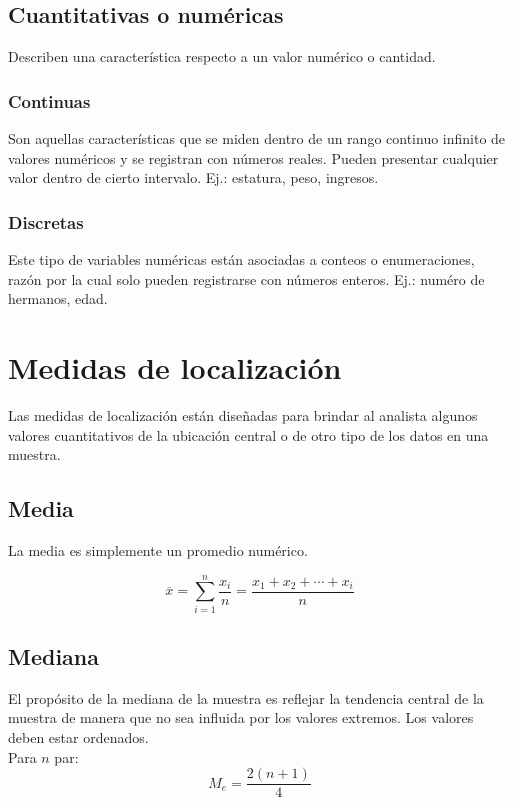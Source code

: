 \documentclass{report}
\begin{document}
      \subsection*{Cuantitativas o numéricas}
        Describen una característica respecto a un valor numérico o cantidad.

        \subsubsection*{Continuas}
          Son aquellas características que se miden dentro de un rango continuo 
          infinito de valores numéricos y se registran con números reales. Pueden 
          presentar cualquier valor dentro de cierto intervalo. Ej.: estatura, 
          peso, ingresos.
        \subsubsection*{Discretas}
          Este tipo de variables numéricas están asociadas a conteos o enumeraciones, 
          razón por la cual solo pueden registrarse con números enteros. Ej.: numéro
          de hermanos, edad.
    \section*{Medidas de localización}
      Las medidas de localización están diseñadas para brindar al analista algunos 
      valores cuantitativos de la ubicación central o de otro tipo de los datos en una 
      muestra.
      
      \subsection*{Media}
        La media es simplemente un promedio numérico.

        \begin{equation*}
          \overline{x}=\sum_{i = 1}^n\frac{x_i}{n}=\frac{x_1+x_2+\dotsm+x_i}{n}
        \end{equation*}

        \subsection*{Mediana}
          El propósito de la mediana de la muestra es reflejar la tendencia central 
          de la muestra de manera que no sea influida por los valores extremos. Los
          valores deben estar ordenados.\\
          \indent Para $n$ par:
          \begin{equation*}
            M_e=\frac{2(n+1)}{4}
          \end{equation*}
\end{document}
